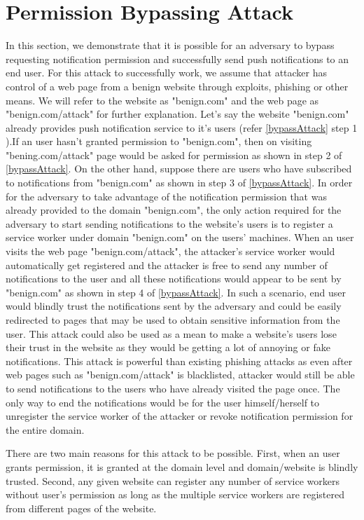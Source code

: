 \section{Permission Bypassing Attack}
In this section, we demonstrate that it is possible for an adversary to  bypass requesting notification permission and successfully send push notifications to an end user.  For this attack to successfully work, we assume that attacker has control of a web page from a benign website  through exploits, phishing or other means. We will refer to the website as "benign.com" and the web page as "benign.com/attack" for further explanation. Let's say the website "benign.com" already provides push notification service to it's users (refer \ref{bypassAttack} step 1 ).If an user hasn't granted permission to "benign.com", then on visiting "bening.com/attack" page would be asked for permission as shown in step 2 of \ref{bypassAttack}. On the other hand, suppose there are users who have subscribed to notifications from "benign.com" as shown in step 3 of \ref{bypassAttack}.  In order for the adversary to take advantage of the notification permission that was already provided to the domain "benign.com", the only action required for the adversary to start sending notifications to the website's users is to register a service worker under domain "benign.com" on the users' machines. When an user visits the web page "benign.com/attack", the attacker's service worker would automatically get registered and the attacker is free to send any number of notifications to the user and all these notifications would appear to be sent by "benign.com" as shown in step 4 of \ref{bypassAttack}. In such a scenario, end user would blindly trust the notifications sent by the adversary and could be easily redirected to pages that may be used to obtain sensitive information from the user. This attack could also be used as a mean to make a website's users lose their trust in the website as they would be getting a lot of annoying or fake notifications. This attack is powerful than existing phishing attacks as even after web pages such as "benign.com/attack" is blacklisted, attacker would still be able to send notifications to the users who have already visited the page once. The only way to end the notifications would be for the user himself/herself to unregister the service worker of the attacker or revoke notification permission for the entire domain.



\noindent There are two main reasons for this attack to be possible. First, when an user grants permission, it is granted at the domain level and domain/website is blindly trusted. Second, any given website can register any number of service workers without user's permission as long as the multiple service workers are registered from different pages of the website. 